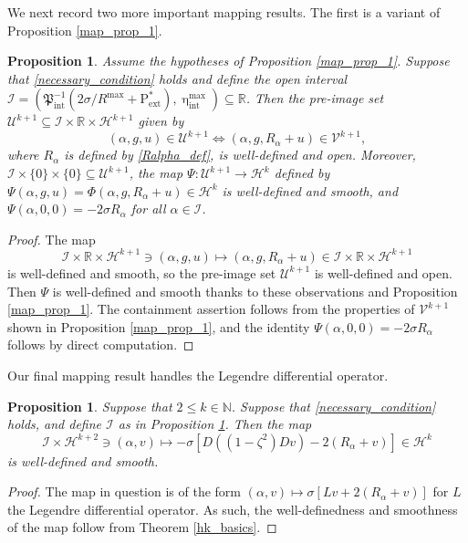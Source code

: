 \documentclass[11pt,reqno]{amsart}
\numberwithin{equation}{section}
\newcommand{\m}{\mathrm}
\def\pfint{\mathfrak{P}_{\m{int}}}
\def\hint{\upeta_{\m{int}}}
\def\pext{\m{P}_{\m{ext}}}
\def\h{\mathcal{H}}
\def\N{\mathbb{N}}
\def\R{\mathbb{R}}
\newtheorem{prop}[lem]{Proposition}
\begin{document}
We next record two more important mapping results.  The first is a variant of Proposition \ref{map_prop_1}.

\begin{prop}\label{map_prop_2}
Assume the hypotheses of Proposition \ref{map_prop_1}.  Suppose that \eqref{necessary_condition} holds and define the open interval $\mathcal{I} =  (\pfint^{-1}( 2\sigma / R^{\m{max}} + \pext^\ast), \hint^{\m{max}}) \subseteq \R$.  Then the pre-image set $\mathcal{U}^{k+1} \subseteq \mathcal{I} \times \R \times \h^{k+1}$ given by  
\begin{equation}
 (\alpha,g,u) \in  \mathcal{U}^{k+1} \Leftrightarrow (\alpha,g, R_\alpha + u) \in \mathcal{V}^{k+1},
\end{equation}
where $R_\alpha$ is defined by \eqref{Ralpha_def}, is well-defined and open.  Moreover, $\mathcal{I} \times \{0\} \times \{0\} \subseteq \mathcal{U}^{k+1}$, the map $\Psi : \mathcal{U}^{k+1} \to \h^k$ defined by $\Psi(\alpha,g,u) = \Phi(\alpha,g,R_\alpha + u) \in \h^k$ is well-defined and smooth, and  $\Psi(\alpha,0,0)=- 2\sigma R_\alpha$  
for all $\alpha \in \mathcal{I}$.
\end{prop}
\begin{proof}
The map  
\begin{equation}
 \mathcal{I} \times \R \times \h^{k+1} \ni (\alpha,g,u) \mapsto (\alpha,g, R_\alpha + u) \in  \mathcal{I} \times \R \times \h^{k+1}
\end{equation}
is well-defined and smooth, so the pre-image set $\mathcal{U}^{k+1}$ is well-defined and open.  Then $\Psi$ is well-defined and smooth thanks to these observations and Proposition \ref{map_prop_1}.  The containment assertion follows from the properties of $\mathcal{V}^{k+1}$ shown in Proposition \ref{map_prop_1}, and the identity  $\Psi(\alpha,0,0)=- 2\sigma R_\alpha$ follows by direct computation. 
\end{proof}

Our final mapping result handles the Legendre differential operator.


\begin{prop}\label{map_prop_3}
Suppose that $2 \le k \in \N$.  Suppose that \eqref{necessary_condition} holds, and define $\mathcal{I}$ as in Proposition \ref{map_prop_2}.   Then the map 
\begin{equation}
 \mathcal{I} \times \h^{k+2} \ni (\alpha,v) \mapsto -\sigma[ D((1-\zeta^2) D v) - 2(R_\alpha + v)   ]    \in \h^k
\end{equation}
is well-defined and smooth.
\end{prop}
\begin{proof}
The map in question is of the form $(\alpha,v) \mapsto \sigma[Lv + 2(R_\alpha + v)]$ for $L$ the Legendre differential operator.  As such, the well-definedness and smoothness of the map follow from Theorem \ref{hk_basics}.
\end{proof}
\end{document}

